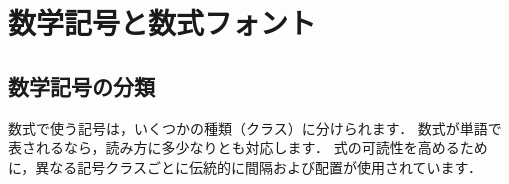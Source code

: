 \newpage


\providecommand{\dotsref}{\leavevmode\unskip\ignorespaces}
\providecommand{\vertref}{\leavevmode\unskip\ignorespaces}

\section{数学記号と数式フォント}\label{mathsymbols}
\subsection{数学記号の分類}

数式で使う記号は，いくつかの種類（クラス）に分けられます．
数式が単語で表されるなら，読み方に多少なりとも対応します．
式の可読性を高めるために，異なる記号クラスごとに伝統的に間隔および配置が使用されています．

